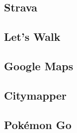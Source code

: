 \subsection{Strava}

\subsection{Let's Walk}

\subsection{Google Maps}

\subsection{Citymapper}

\subsection{Pok\'{e}mon Go}






%
%
%
%
